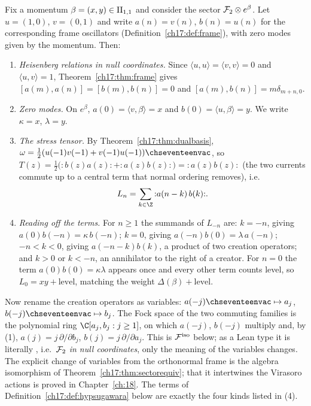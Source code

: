 Fix a momentum $\beta=(x,y)\in{\mathrm{II}_{1,1}}$ and consider the sector $\mathcal{F}_2\otimes e^\beta$.  Let $u=(1,0)$, $v=(0,1)$ and
write $a(n)=v(n)$, $b(n)=u(n)$ for the corresponding frame oscillators (Definition~\ref{ch17:def:frame}), with zero
modes given by the momentum.  Then:
\begin{enumerate}[label=(\arabic*)]
\item \emph{Heisenberg relations in null coordinates.}  Since $\langle u,u\rangle=\langle v,v\rangle=0$ and $\langle u,v\rangle=1$,
  Theorem~\ref{ch17:thm:frame} gives $[a(m),a(n)]=[b(m),b(n)]=0$ and $[a(m),b(n)]=m\delta_{m+n,0}$.
\item \emph{Zero modes.}  On $e^\beta$, $a(0)=\langle v,\beta\rangle=x$ and $b(0)=\langle u,\beta\rangle=y$.  We write
  $\kappa=x$, $\lambda=y$.
\item \emph{The stress tensor.}  By Theorem~\ref{ch17:thm:dualbasis}, $\omega=\frac12(u(-1)v(-1)+v(-1)u(-1))\chseventeenvac$, so
  $T(z)=\frac12\bigl({:}b(z)a(z){:}+{:}a(z)b(z){:}\bigr)={:}a(z)b(z){:}$ (the two currents commute up to a central term
  that normal ordering removes), i.e.
  \begin{equation*}
    L_n=\sum_{k\in\Z}{:}a(n-k)\,b(k){:} .
  \end{equation*}
\item \emph{Reading off the terms.}  For $n\ge1$ the summands of $L_{-n}$ are: $k=-n$, giving $a(0)b(-n)=\kappa\,b(-n)$;
  $k=0$, giving $a(-n)b(0)=\lambda\,a(-n)$; $-n<k<0$, giving $a(-n-k)b(k)$, a product of two creation operators;
  and $k>0$ or $k<-n$, an annihilator to the right of a creator.  For $n=0$ the term $a(0)b(0)=\kappa\lambda$ appears
  once and every other term counts level, so $L_0=xy+\text{level}$, matching the weight
  $\Delta(\beta)+\text{level}$.
\end{enumerate}
Now rename the creation operators as variables: $a(-j)\chseventeenvac\mapsto a_j$, $b(-j)\chseventeenvac\mapsto b_j$.  The Fock space of
the two commuting families is the polynomial ring $\C[a_j,b_j:j\ge1]$, on which $a(-j)$, $b(-j)$ multiply and, by (1),
$a(j)=j\,\partial/\partial b_j$, $b(j)=j\,\partial/\partial a_j$.  This is $\mathcal{F}^{\mathrm{iso}}$ below; as a Lean type it is literally
, i.e.\ $\mathcal{F}_2$ \emph{in null coordinates}, only the meaning of the variables changes.  The
explicit change of variables from the orthonormal frame is the algebra isomorphism of Theorem~\ref{ch17:thm:sectorequiv};
that it intertwines the Virasoro actions is proved in Chapter~\ref{ch:18}.  The terms of Definition~\ref{ch17:def:hypsugawara}
below are exactly the four kinds listed in (4).


